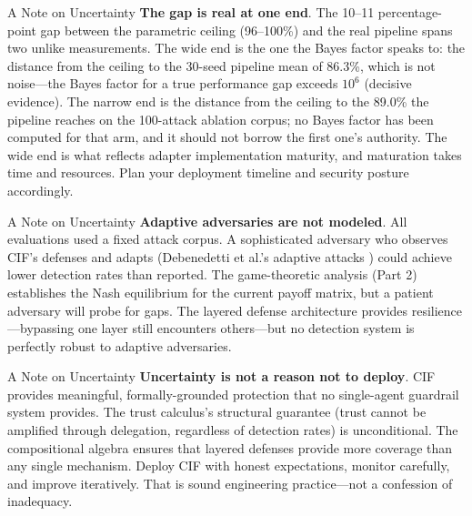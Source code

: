 \documentclass[
  ignorenonframetext,
]{beamer}
\begin{document}
\begin{frame}[allowframebreaks]{A Note on Uncertainty}
\textbf{The gap is real at one end}. The 10--11 percentage-point gap
between the parametric ceiling (96--100\%) and the real pipeline spans
two unlike measurements. The wide end is the one the Bayes factor speaks
to: the distance from the ceiling to the 30-seed pipeline mean of
86.3\%, which is not noise---the Bayes factor for a true performance gap
exceeds \(10^6\) (decisive evidence). The narrow end is the distance
from the ceiling to the 89.0\% the pipeline reaches on the 100-attack
ablation corpus; no Bayes factor has been computed for that arm, and it
should not borrow the first one's authority. The wide end is what
reflects adapter implementation maturity, and maturation takes time and
resources. Plan your deployment timeline and security posture
accordingly.

\end{frame}

\begin{frame}[allowframebreaks]{A Note on Uncertainty}
\textbf{Adaptive adversaries are not modeled}. All evaluations used a
fixed attack corpus. A sophisticated adversary who observes CIF's
defenses and adapts (Debenedetti et al.'s adaptive attacks
\cite{adaptive2025attacks}) could achieve lower detection rates than
reported. The game-theoretic analysis (Part 2) establishes the Nash
equilibrium for the current payoff matrix, but a patient adversary will
probe for gaps. The layered defense architecture provides
resilience---bypassing one layer still encounters others---but no
detection system is perfectly robust to adaptive adversaries.

\end{frame}

\begin{frame}[allowframebreaks]{A Note on Uncertainty}
\textbf{Uncertainty is not a reason not to deploy}. CIF provides
meaningful, formally-grounded protection that no single-agent guardrail
system provides. The trust calculus's structural guarantee (trust cannot
be amplified through delegation, regardless of detection rates) is
unconditional. The compositional algebra ensures that layered defenses
provide more coverage than any single mechanism. Deploy CIF with honest
expectations, monitor carefully, and improve iteratively. That is sound
engineering practice---not a confession of inadequacy.
\end{frame}
\end{document}
